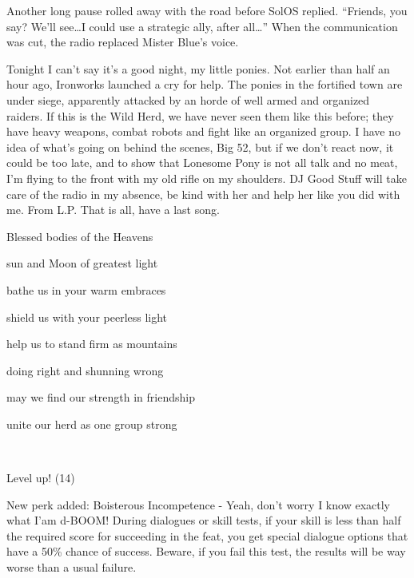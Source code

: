 Another long pause rolled away with the road before SolOS replied. ``Friends, you say? We'll see\dots I could use a strategic ally, after all\dots'' When the communication was cut, the radio replaced Mister Blue's voice.


{\rt Tonight I can't say it's a good night, my little ponies. Not earlier than half an hour ago, Ironworks launched a cry for help. The ponies in the fortified town are under siege, apparently attacked by an horde of well armed and organized raiders. If this is the Wild Herd, we have never seen them like this before; they have heavy weapons, combat robots and fight like an organized group. I have no idea of what's going on behind the scenes, Big 52, but if we don't react now, it could be too late, and to show that Lonesome Pony is not all talk and no meat, I'm flying to the front with my old rifle on my shoulders. DJ Good Stuff will take care of the radio in my absence, be kind with her and help her like you did with me. From L.P. That is all, have a last song.}

\begin{song}
    Blessed bodies of the Heavens

    sun and Moon of greatest light

    bathe us in your warm embraces

    shield us with your peerless light

    help us to stand firm as mountains

    doing right and shunning wrong

    may we find our strength in friendship

    unite our herd as one group strong
\end{song}

~\vfill

\begin{engnote}
    Level up! (14)
    
    New perk added: Boisterous Incompetence - Yeah, don't worry I know exactly what I'am d-BOOM! During dialogues or skill tests, if your skill is less than half the required score for succeeding in the feat, you get special dialogue options that have a 50\% chance of success. Beware, if you fail this test, the results will be way worse than a usual failure.
\end{engnote}


